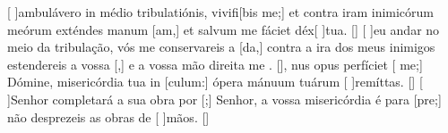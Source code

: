 {  %
  {[ ]{am}bulávero in médio tribulatiónis, vivifi[bis me;] et contra iram inimicórum meórum exténdes manum 
  [am,] et salvum me fáciet déx[ ]{tu}a. [\LinkLA]}%
  {[ ]{eu} andar no meio da tribulação, vós me conservareis a [da,] contra a ira dos meus inimigos estendereis a vossa [,] e a vossa mão direita me . [\LinkPT]},
  {nus opus perfíciet [ me;] Dómine, misericórdia tua in [culum:] ópera mánuum tuárum 
  [ ]{re}{mít}tas. [\LinkLA]}%
  {[ ]{Se}nhor completará a sua obra por [;] Senhor, a vossa misericórdia é para [pre;] não desprezeis as obras de [ ]{mãos}. [\LinkPT]}
}